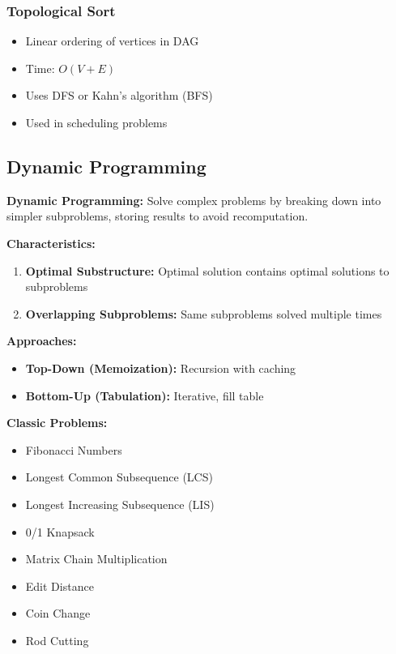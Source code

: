 \documentclass[11pt,a4paper]{article}
\begin{document}
\subsubsection{Topological Sort}
\begin{itemize}
    \item Linear ordering of vertices in DAG
    \item Time: $O(V + E)$
    \item Uses DFS or Kahn's algorithm (BFS)
    \item Used in scheduling problems
\end{itemize}

\subsection{Dynamic Programming}

\begin{defbox}
\textbf{Dynamic Programming:} Solve complex problems by breaking down into simpler subproblems, storing results to avoid recomputation.
\end{defbox}

\textbf{Characteristics:}
\begin{enumerate}
    \item \textbf{Optimal Substructure:} Optimal solution contains optimal solutions to subproblems
    \item \textbf{Overlapping Subproblems:} Same subproblems solved multiple times
\end{enumerate}

\textbf{Approaches:}
\begin{itemize}
    \item \textbf{Top-Down (Memoization):} Recursion with caching
    \item \textbf{Bottom-Up (Tabulation):} Iterative, fill table
\end{itemize}

\textbf{Classic Problems:}
\begin{itemize}
    \item Fibonacci Numbers
    \item Longest Common Subsequence (LCS)
    \item Longest Increasing Subsequence (LIS)
    \item 0/1 Knapsack
    \item Matrix Chain Multiplication
    \item Edit Distance
    \item Coin Change
    \item Rod Cutting
\end{itemize}
\end{document}
